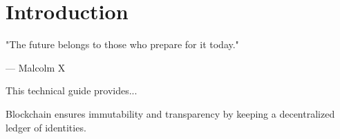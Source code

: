 \documentclass[12pt,a4paper,twoside,openright]{book}
\begin{document}
\chapter{Introduction}
\epigraph{"The future belongs to those who prepare for it today."}{— Malcolm X}
This technical guide provides...

\begin{important}
Blockchain ensures immutability and transparency by keeping a decentralized ledger of identities.
\end{important}


\appendix

\clearpage
\printglossaries
\end{document}
